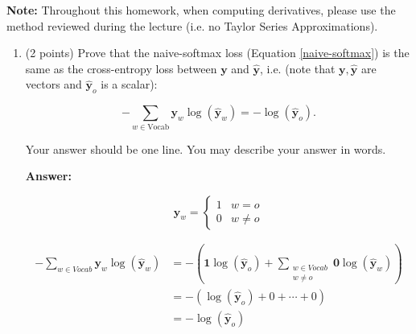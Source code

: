 \documentclass{article}
\newenvironment{answer}{
    {\bf Answer:} \sf \begingroup\color{red}
}{\endgroup}%
\begin{document}
\textbf{Note:} Throughout this homework, when computing derivatives, please use the method reviewed during the lecture (i.e. no Taylor Series Approximations).

\clearpage 
\begin{enumerate}[label=(\alph*)]
\item (2 points) 
Prove that the naive-softmax loss (Equation \ref{naive-softmax}) is the same as the cross-entropy loss between $\bm y$ and $\hat{\bm y}$, i.e. (note that $\bm y, \hat{\bm y}$ are vectors and $\hat{\bm y}_o$ is a scalar):

\begin{equation} 
-\sum_{w \in \text{Vocab}} \bm y_w \log(\hat{\bm y}_w) = - \log (\hat{\bm y}_o).
\end{equation}

Your answer should be one line. You may describe your answer in words.
\begin{shaded}
\begin{answer}
    \begin{equation}
        \bm y_w =
        \begin{cases}
            1 &w=o \\
            0 &w\neq o
        \end{cases}\label{eq:1a1}
    \end{equation}

    \begin{equation}
        \begin{align}
            -\sum_{w\in{Vocab}}\bm y_w\log(\hat{\bm y}_w) &= -\left(\mathbf{1}\log(\hat{\bm y}_o) + \sum_{{\substack{w\in{Vocab} \\ w\neq o}}}\mathbf{0}\log(\hat{\bm y}_w)\right) \\
            &= -\left(\log(\hat{\bm y}_o) + 0 + \cdots + 0\right) \\
            &= -\log(\hat{\bm y}_o)
        \end{align}\label{eq:1a2}
    \end{equation}
\end{answer}
\end{shaded}


\end{enumerate}
\end{document}
